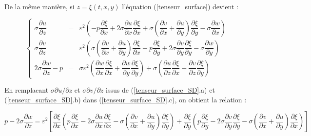 \documentclass[10pt,a4paper]{amsart}
\begin{document}
De la même manière, si $z=\xi(t,x,y)$ l'équation (\ref{tenseur_surface}) devient :


\begin{equation}\label{tenseur_surface_SD}
\left\{
\begin{array}{rcl}
\sigma \dfrac{\partial u}{\partial z} & = & \varepsilon^2 \left( -p\dfrac{\partial \xi}{\partial x} + 2 \sigma \dfrac{\partial u}{\partial x}\dfrac{\partial \xi}{\partial x} + \sigma \left( \dfrac{\partial v}{\partial x} + \dfrac{\partial u}{\partial y} \right) \dfrac{\partial \xi}{\partial y} - \sigma \dfrac{\partial w}{\partial x} \right)\\


\sigma \dfrac{\partial v}{\partial z} & = & \varepsilon^2 \left( \sigma \left( \dfrac{\partial v}{\partial x} + \dfrac{\partial u}{\partial y} \right)\dfrac{\partial \xi}{\partial x} - p\dfrac{\partial \xi}{\partial y} + 2 \sigma \dfrac{\partial v}{\partial y} \dfrac{\partial \xi}{\partial y} - \sigma \dfrac{\partial w}{\partial y} \right)\\


2 \sigma \dfrac{\partial w}{\partial z} - p & = &\sigma \varepsilon^2 \left( \dfrac{\partial w}{\partial x} \dfrac{\partial \xi}{\partial x} +  \dfrac{\partial w}{\partial y} \dfrac{\partial \xi}{\partial y} \right) + \sigma \left( \dfrac{\partial u}{\partial z} \dfrac{\partial \xi}{\partial x} + \dfrac{\partial v}{\partial z} \dfrac{\partial \xi}{\partial y} \right) 

\end{array}
\right.
\end{equation}



En remplacant $\sigma \partial u / \partial z$ et $\sigma \partial v / \partial z$ issus de (\ref{tenseur_surface_SD}.a) et (\ref{tenseur_surface_SD}.b) dans (\ref{tenseur_surface_SD}.c), on obtient la relation :

\begin{equation}\label{noncisaillement_surface_SD}
p - 2 \sigma \dfrac{\partial w}{\partial z} = \varepsilon^2 \left[ \dfrac{\partial \xi}{\partial x} \left( p\dfrac{\partial \xi}{\partial x} - 2 \sigma \dfrac{\partial u}{\partial x} \dfrac{\partial \xi}{\partial x} -  \sigma \left( \dfrac{\partial v}{\partial x} + \dfrac{\partial u}{\partial y} \right)\dfrac{\partial \xi}{\partial y} \right) + \dfrac{\partial \xi}{\partial y} \left( p\dfrac{\partial \xi}{\partial y} - 2 \sigma \dfrac{\partial v}{\partial y} \dfrac{\partial \xi}{\partial y} - \sigma \left( \dfrac{\partial v}{\partial x} + \dfrac{\partial u}{\partial y} \right)\dfrac{\partial \xi}{\partial x} \right) \right]
\end{equation}
\end{document}
